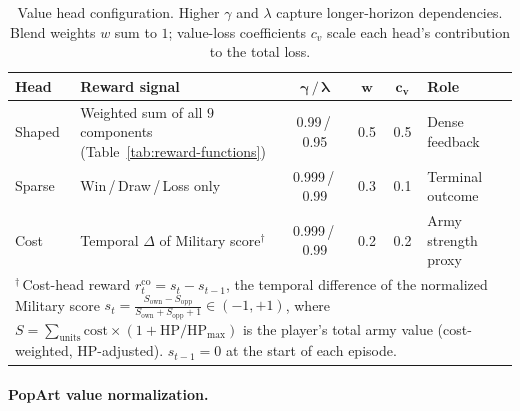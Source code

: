 \begin{table}[!htb]
\centering
\caption[Value head configuration]{Value head configuration. Higher $\gamma$ and $\lambda$ capture longer-horizon dependencies. Blend weights $w$ sum to $1$; value-loss coefficients $c_v$ scale each head's contribution to the total loss.}
\label{tab:value-heads}
\small
\begin{tabularx}{\textwidth}{@{}l X c c c l@{}}
\toprule
\textbf{Head} & \textbf{Reward signal} & $\boldsymbol{\gamma}\,/\,\boldsymbol{\lambda}$ & $\boldsymbol{w}$ & $\boldsymbol{c_v}$ & \textbf{Role} \\
\midrule
Shaped  & Weighted sum of all $9$ components (Table~\ref{tab:reward-functions}) & 0.99\,/\,0.95  & 0.5 & 0.5 & Dense feedback \\
Sparse  & Win\,/\,Draw\,/\,Loss only                              & 0.999\,/\,0.99 & 0.3 & 0.1 & Terminal outcome \\
Cost    & Temporal $\Delta$ of Military score$^{\dagger}$ & 0.999\,/\,0.99 & 0.2 & 0.2 & Army strength proxy \\
\bottomrule
\multicolumn{6}{p{\textwidth}}{\footnotesize $^{\dagger}$\,Cost-head reward $r^{\text{co}}_t = s_t - s_{t-1}$, the temporal difference of the normalized Military score $s_t = \frac{S_{\text{own}} - S_{\text{opp}}}{S_{\text{own}} + S_{\text{opp}} + 1} \in (-1, +1)$, where $S = \sum_{\text{units}} \text{cost} \times (1 + \text{HP}/\text{HP}_{\max})$ is the player's total army value (cost-weighted, HP-adjusted). $s_{t-1} = 0$ at the start of each episode.} \\
\end{tabularx}
\end{table}

\paragraph{PopArt value normalization.}

